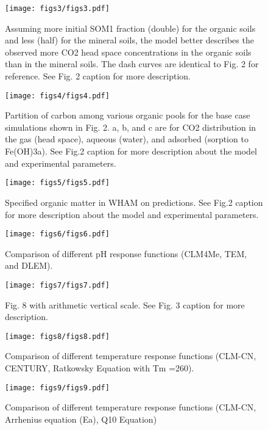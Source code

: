 \documentclass[12pt, a4paper]{article}
\begin{document}
\begin{figure}
\centering
\texttt{[image: figs3/figs3.pdf]}
\caption{
Assuming more initial SOM1 fraction (double) for the organic soils and less (half) for the mineral soils, the model better describes the observed more CO2 head space concentrations in the organic soils than in the mineral soils. The dash curves are identical to Fig. 2 for reference. See Fig. 2 caption for more description.}
\label{figs3}
\end{figure}

\begin{figure}
\centering
\texttt{[image: figs4/figs4.pdf]}
\caption{
Partition of carbon among various organic pools for the base case simulations
shown in Fig. 2. a, b, and c are for CO2 distribution in the gas (head space),
aqueous (water), and adsorbed (sorption to Fe(OH)3a).  See Fig.2 caption for
more description about the model and experimental parameters.
}
\label{figs4}
\end{figure}

\begin{figure}
\centering
\texttt{[image: figs5/figs5.pdf]}
\caption{
Specified organic matter in WHAM on predictions. See Fig.2 caption for more
description about the model and experimental parameters.
}
\label{figs5}
\end{figure}

\begin{figure}
\centering
\texttt{[image: figs6/figs6.pdf]}
\caption{
Comparison of different pH response functions (CLM4Me, TEM, and DLEM).
}
\label{figs6}
\end{figure}

\begin{figure}
\centering
\texttt{[image: figs7/figs7.pdf]}
\caption{
Fig. 8 with arithmetic vertical scale. See Fig. 3 caption for more description.
}
\label{figs7}
\end{figure}

\begin{figure}
\centering
\texttt{[image: figs8/figs8.pdf]}
\caption{
Comparison of different temperature response functions (CLM-CN, CENTURY, Ratkowsky Equation with Tm =260).
}
\label{figs8}
\end{figure}

\begin{figure}
\centering
\texttt{[image: figs9/figs9.pdf]}
\caption{
Comparison of different temperature response functions (CLM-CN, Arrhenius equation (Ea), Q10 Equation)
}
\label{figs9}
\end{figure}











\clearpage
%
%
\end{document}
